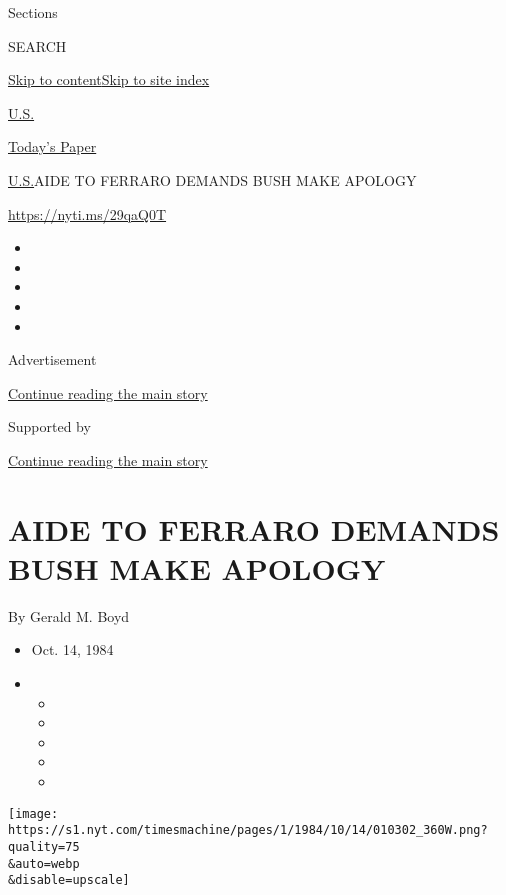 Sections

SEARCH

\protect\hyperlink{site-content}{Skip to
content}\protect\hyperlink{site-index}{Skip to site index}

\href{https://www.nytimes.com/section/us}{U.S.}

\href{https://myaccount.nytimes.com/auth/login?response_type=cookie\&client_id=vi}{}

\href{https://www.nytimes.com/section/todayspaper}{Today's Paper}

\href{/section/us}{U.S.}\textbar{}AIDE TO FERRARO DEMANDS BUSH MAKE
APOLOGY

\href{https://nyti.ms/29qaQ0T}{https://nyti.ms/29qaQ0T}

\begin{itemize}
\item
\item
\item
\item
\item
\end{itemize}

Advertisement

\protect\hyperlink{after-top}{Continue reading the main story}

Supported by

\protect\hyperlink{after-sponsor}{Continue reading the main story}

\hypertarget{aide-to-ferraro-demands-bush-make-apology}{%
\section{AIDE TO FERRARO DEMANDS BUSH MAKE
APOLOGY}\label{aide-to-ferraro-demands-bush-make-apology}}

By Gerald M. Boyd

\begin{itemize}
\item
  Oct. 14, 1984
\item
  \begin{itemize}
  \item
  \item
  \item
  \item
  \item
  \end{itemize}
\end{itemize}

\texttt{[image: https://s1.nyt.com/timesmachine/pages/1/1984/10/14/010302\_360W.png?quality=75\\\&auto=webp\\\&disable=upscale]}

